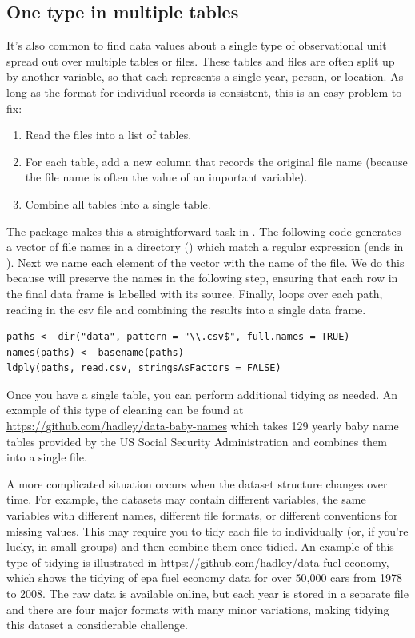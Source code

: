 \documentclass[article]{jss}
\begin{document}
\subsection{One type in multiple tables}

It's also common to find data values about a single type of observational unit spread out over multiple tables or files. These tables and files are often split up by another variable, so that each represents a single year, person, or location. As long as the format for individual records is consistent, this is an easy problem to fix: 

\begin{enumerate}
  \item Read the files into a list of tables.

\item For each table, add a new column that records the original file name (because the file name is often the value of an important variable).

  \item Combine all tables into a single table. 
\end{enumerate}

The  package makes this a straightforward task in . The following code generates a vector of file names in a directory () which match a regular expression (ends in ). Next we name each element of the vector with the name of the file. We do this because  will preserve the names in the following step, ensuring that each row in the final data frame is labelled with its source. Finally,  loops over each path, reading in the csv file and combining the results into a single data frame.

\begin{Verbatim}
paths <- dir("data", pattern = "\\.csv$", full.names = TRUE)
names(paths) <- basename(paths)
ldply(paths, read.csv, stringsAsFactors = FALSE)
\end{Verbatim}

Once you have a single table, you can perform additional tidying as needed. An example of this type of cleaning can be found at \url{https://github.com/hadley/data-baby-names} which takes 129 yearly baby name tables provided by the US Social Security Administration and combines them into a single file.

A more complicated situation occurs when the dataset structure changes over time. For example, the datasets may contain different variables, the same variables with different names, different file formats, or different conventions for missing values. This may require you to tidy each file to individually (or, if you're lucky, in small groups) and then combine them once tidied. An example of this type of tidying is illustrated in \url{https://github.com/hadley/data-fuel-economy}, which shows the tidying of {\sc epa} fuel economy data for over 50,000 cars from 1978 to 2008. The raw data is available online, but each year is stored in a separate file and there are four major formats with many minor variations, making tidying this dataset a considerable challenge.
\end{document}
